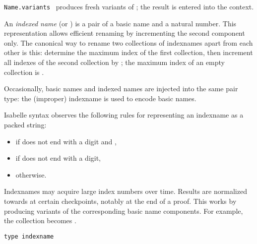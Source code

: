 \begin{isabellebody}
\begin{isamarkuptext}
\begin{description}
  \item \verb|Name.variants|~ produces fresh
  variants of ; the result is entered into the context.

  \end{description}%
\end{isamarkuptext}%
\isamarkuptrue%
%
\endisatagmlref
{\isafoldmlref}%
%
\isadelimmlref
%
\endisadelimmlref
%
\isamarkuptrue%
%
\begin{isamarkuptext}%
An \emph{indexed name} (or ) is a pair of a basic
  name and a natural number.  This representation allows efficient
  renaming by incrementing the second component only.  The canonical
  way to rename two collections of indexnames apart from each other is
  this: determine the maximum index  of the first
  collection, then increment all indexes of the second collection by
  ; the maximum index of an empty collection is
  .

  Occasionally, basic names and indexed names are injected into the
  same pair type: the (improper) indexname  is used
  to encode basic names.

  \medskip Isabelle syntax observes the following rules for
  representing an indexname  as a packed string:

  \begin{itemize}

  \item {} if  does not end with a digit and ,

  \item {} if  does not end with a digit,

  \item {} otherwise.

  \end{itemize}

  Indexnames may acquire large index numbers over time.  Results are
  normalized towards  at certain checkpoints, notably at
  the end of a proof.  This works by producing variants of the
  corresponding basic name components.  For example, the collection
   becomes .%
\end{isamarkuptext}%
\isamarkuptrue%
%
\isadelimmlref
%
\endisadelimmlref
%
\isatagmlref
%
\begin{isamarkuptext}%
\begin{mldecls}
  \verb|type indexname| \\
  \end{mldecls}


\end{isamarkuptext}
\end{isabellebody}
